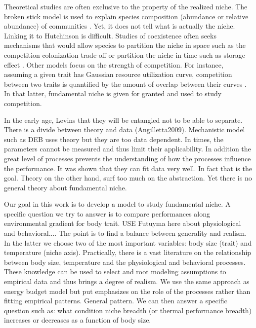  Theoretical studies are often exclusive to the property of the realized niche. 
The broken stick model is used to explain species composition (abundance or relative abundance) of communities \citep{MacArthur1957}.
Yet, it does not tell what is actually the niche.
Linking it to Hutchinson is difficult.
Studies of coexistence often seeks mechanisms that would allow species to partition the niche in space such as the competition colonization trade-off \citep[e.g.,][]{Levins1971,Tilman1994} or partition the niche in time such as storage effect \citep{Skellam1951, Chesson2000}. %
Other models focus on the strength of competition.
For instance, assuming a given trait has Gaussian resource utilization curve, competition  between two traits is quantified by the amount of overlap between their curves \citep{MacArthur1967, Roughgarden1979}.%
In that latter, fundamental niche is given for granted and used to study competition.

In the early age, Levins that they will be entangled not to be able to separate.
There is a divide between theory and data (Angilletta2009).
Mechanistic model such as DEB uses theory but they are too data dependent.
In times, the parameters cannot be measured and thus limit their applicability.
In addition the great level of processes prevents the understanding of how the processes influence the performance.
It was shown that they can fit data very well.
In fact that is the goal.
Theory on the other hand, surf too much on the abstraction.
Yet there is no general theory about fundamental niche.

Our goal in this work is to develop a model to study fundamental niche.
A specific question we try to answer is to compare performances along environmental gradient for body trait.
USE Futuyma here about physiological and behavioral....
The point is to find a balance between generality and realism.
In the latter we choose two of the most important variables: body size (trait) and temperature (niche axis).
Practically, there is a vast literature on the relationship between body size, temperature and the physiological and behavioral processes.
These knowledge can be used to select and root modeling assumptions to empirical data and thus brings a degree of realism.
We use the same approach as energy budget model but put emphasizes on the role of the processes rather than fitting empirical patterns.
General pattern.
We can then answer a specific question such as: what condition niche breadth (or thermal performance breadth) increases or decreases as a function of body size.

